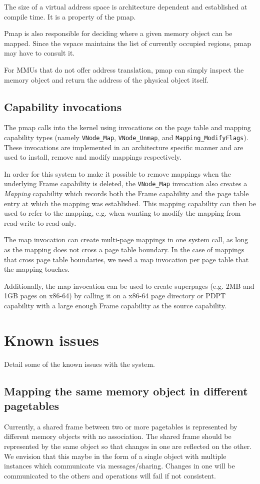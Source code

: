 \documentclass[a4paper,twoside]{report} %
\begin{document}
The size of a virtual address space is architecture dependent and established at compile time.
It is a property of the pmap.

Pmap is also responsible for deciding where a given memory object can be mapped.
Since the vspace maintains the list of currently occupied regions, pmap may have to consult it.

For MMUs that do not offer address translation,
pmap can simply inspect the memory object and return the address of the physical object itself.

\section{Capability invocations}

The pmap calls into the kernel using invocations on the page table and mapping
capability types (namely \verb|VNode_Map|, \verb|VNode_Unmap|, and
\verb|Mapping_ModifyFlags|).  These invocations are implemented in an
architecture specific manner and are used to install, remove and modify
mappings respectively.

In order for this system to make it possible to remove mappings when the
underlying Frame capability is deleted, the \verb|VNode_Map| invocation also
creates a \emph{Mapping} capability which records both the Frame capability
and the page table entry at which the mapping was established.
This mapping capability can then be used to refer to the mapping, e.g. when
wanting to modify the mapping from read-write to read-only.

The map invocation can create multi-page mappings in one system call, as long
as the mapping does not cross a page table boundary.
In the case of mappings that cross page table boundaries, we need a map
invocation per page table that the mapping touches.

Additionally, the map invocation can be used to create superpages (e.g. 2MB
and 1GB pages on x86-64) by calling it on a x86-64 page directory or PDPT
capability with a large enough Frame capability as the source capability.

\chapter{Known issues}
Detail some of the known issues with the system.

\section{Mapping the same memory object in different pagetables}
Currently, a shared frame between two or more pagetables is
represented by different memory objects with no association.
The shared frame should be represented by the same object so that changes in one are reflected on the other.
We envision that this maybe in the form of a single object
with multiple instances which communicate via messages/sharing.
Changes in one will be communicated to the others and operations will fail if not consistent.
\end{document}

